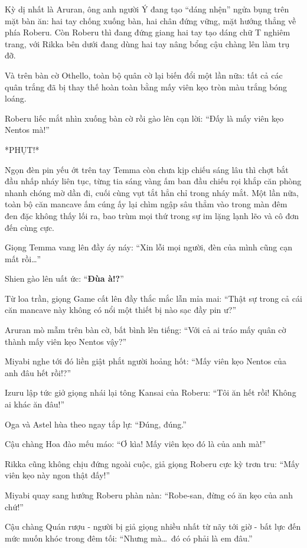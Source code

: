 \documentclass[../main.tex]{subfiles}
\begin{document}
Kỳ dị nhất là Aruran, ông anh người Ý đang tạo ``dáng nhện'' ngửa bụng trên mặt bàn ăn: hai tay chống xuống bàn, hai chân đứng vững, mặt hướng thẳng về phía Roberu. Còn Roberu thì đang đứng giang hai tay tạo dáng chữ T nghiêm trang, với Rikka bên dưới đang dùng hai tay nâng bổng cậu chàng lên làm trụ đỡ.


Và trên bàn cờ Othello, toàn bộ quân cờ lại biến đổi một lần nữa: tất cả các quân trắng đã bị thay thế hoàn toàn bằng mấy viên kẹo tròn màu trắng bóng loáng.


Roberu liếc mắt nhìn xuống bàn cờ rồi gào lên cạn lời: ``Đấy là mấy viên kẹo Nentos mà!''

*PHỤT!*

Ngọn đèn pin yếu ớt trên tay Temma còn chưa kịp chiếu sáng lâu thì chợt bắt đầu nhấp nháy liên tục, từng tia sáng vàng ấm ban đầu chiếu rọi khắp căn phòng nhanh chóng mờ dần đi, cuối cùng vụt tắt hẳn chỉ trong nháy mắt. Một lần nữa, toàn bộ căn mancave ấm cúng ấy lại chìm ngập sâu thẳm vào trong màn đêm đen đặc không thấy lối ra, bao trùm mọi thứ trong sự im lặng lạnh lẽo và cô đơn đến cùng cực.

Giọng Temma vang lên đầy áy náy: ``Xin lỗi mọi người, đèn của mình cũng cạn mất rồi\dots''

Shien gào lên uất ức: ``\textbf{Đùa à!?}''

Từ loa trần, giọng Game cất lên đầy thắc mắc lẫn mỉa mai: ``Thật sự trong cả cái căn mancave này không có nổi một thiết bị nào sạc đầy pin ư?''

Aruran mò mẫm trên bàn cờ, bất bình lên tiếng: ``Với cả ai tráo mấy quân cờ thành mấy viên kẹo Nentos vậy?''

Miyabi nghe tới đó liền giật phắt người hoảng hốt: ``Mấy viên kẹo Nentos của anh đâu hết rồi!?''

Izuru lập tức giở giọng nhái lại tông Kansai của Roberu: ``Tôi ăn hết rồi! Không ai khác ăn đâu!''

Oga và Astel hùa theo ngay tắp lự: ``Đúng, đúng.''

Cậu chàng Hoa đào mếu máo: ``Ơ kìa! Mấy viên kẹo đó là của anh mà!''

Rikka cũng không chịu đứng ngoài cuộc, giả giọng Roberu cực kỳ trơn tru: ``Mấy viên kẹo này ngon thật đấy!''

Miyabi quay sang hướng Roberu phàn nàn: ``Robe-san, đừng có ăn kẹo của anh chứ!''

Cậu chàng Quán rượu - người bị giả giọng nhiều nhất từ nãy tới giờ - bất lực đến mức muốn khóc trong đêm tối: ``Nhưng mà\dots\ đó có phải là em đâu.''
\end{document}
